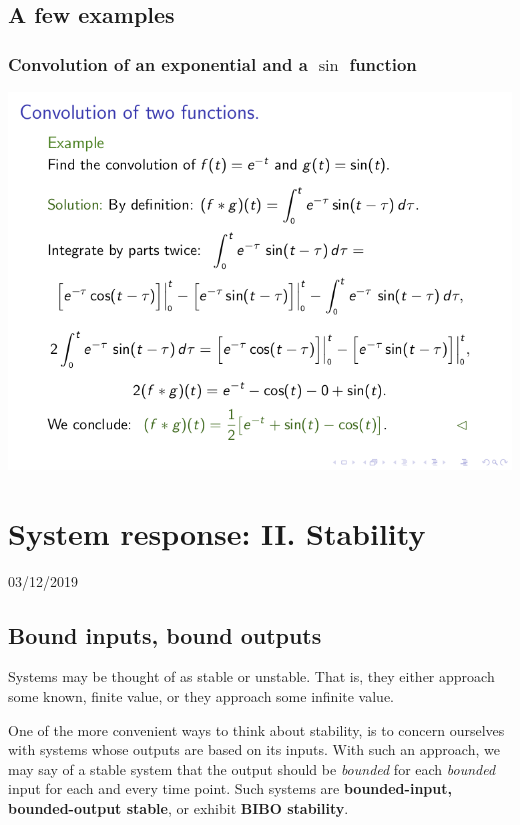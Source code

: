\documentclass[11pt]{book}
\begin{document}
\section{A few examples}

\subsection{Convolution of an exponential and a $\sin$ function}

\includegraphics[width=\textwidth]{figures/13.04.png}


\chapter{System response: II. Stability}
03/12/2019
\minitoc
\newpage

\section{Bound inputs, bound outputs}
Systems may be thought of as stable or unstable. That is, they either approach some known, finite value, or they approach some infinite value.

One of the more convenient ways to think about stability, is to concern ourselves with systems whose outputs are based on its inputs. With such an approach, we may say of a stable system that the output should be \textit{bounded} for each \textit{bounded} input for each and every time point. Such systems are \textbf{bounded-input, bounded-output stable}, or exhibit \textbf{BIBO stability}.
\end{document}
